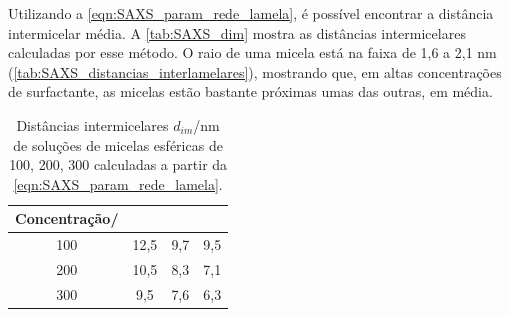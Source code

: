 	Utilizando a \autoref{eqn:SAXS_param_rede_lamela}, é possível encontrar a distância intermicelar média. A \autoref{tab:SAXS_dim} mostra as distâncias intermicelares calculadas por esse método. O raio de uma micela está na faixa de 1,6 a 2,1 nm (\autoref{tab:SAXS_distancias_interlamelares}), mostrando que, em altas concentrações de surfactante, as micelas  estão bastante próximas umas das outras, em média.
	
	
		\begin{table}[h]
		\IBGEtab%
		{\caption{Distâncias intermicelares \(d_{im}\)/nm de soluções de micelas esféricas de \CTDTAB{} 100, 200, 300 \mM{} calculadas a partir da \autoref{eqn:SAXS_param_rede_lamela}.}
			\label{tab:SAXS_dim}}%
		{\begin{tabular}{c | c c c}
			\toprule
			Concentração/\mM & \CTAB  & \TTAB & \DTAB  \\ \midrule
			    100      & 12,5 & 9,7 & 9,5 \\
			    200      & 10,5 & 8,3 & 7,1 \\
			    300      & 9,5 & 7,6 & 6,3 \\ \bottomrule
		\end{tabular}}%
		{}
	\end{table}
	
